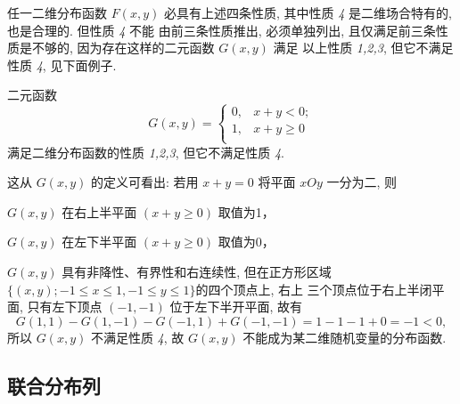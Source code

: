    任一二维分布函数 $F(x,y)$ 必具有上述四条性质, 其中性质 \textit{4} 是二维场合特有的, 也是合理的. 但性质 \textit{4} 不能
   由前三条性质推出, 必须单独列出, 且仅满足前三条性质是不够的, 因为存在这样的二元函数 $G(x,y)$ 满足
   以上性质 \textit{1,2,3}, 但它不满足性质 \textit{4}, 见下面例子.

   \begin{example}\label{exam:3.1.1}
   	二元函数
   	\[
   	 	G(x,y)=\begin{cases}
   	 		0,	& x+y<0;\\
   	 		1,	& x+y\geq 0 \\
   	 	\end{cases}
   	\]
   	满足二维分布函数的性质 \textit{1,2,3}, 但它不满足性质 \textit{4}.

    这从 $G(x,y)$ 的定义可看出: 若用 $x+y=0$ 将平面 $xOy$ 一分为二, 则
 
    $G(x,y)$ 在右上半平面 $(x+y\geq 0)$ 取值为1，
   
    $G(x,y)$ 在左下半平面 $(x+y\geq 0)$ 取值为0，

    $G(x,y)$ 具有非降性、有界性和右连续性, 但在正方形区域 $\{(x,y); -1\leq x\leq 1,-1\leq y\leq 1\}$的四个顶点上, 右上
    三个顶点位于右上半闭平面, 只有左下顶点 $(-1,-1)$ 位于左下半开平面, 故有
    \[
     	G(1,1)-G(1,-1)-G(-1,1)+G(-1,-1)=1-1-1+0=-1<0,
    \]
	所以 $G(x,y)$ 不满足性质 \textit{4}, 故 $G(x,y)$ 不能成为某二维随机变量的分布函数.
   \end{example}

   \subsection{联合分布列}\label{ssec:3.1.3}

